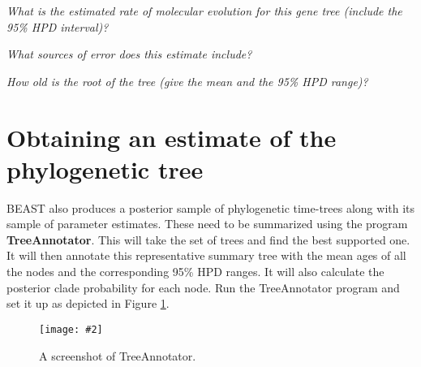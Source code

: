 \documentclass[11pt]{article}
\theoremstyle{plain}%
\theoremstyle{definition}
\theoremstyle{remark}
\newcommand{\includeimage}[2][]{%
\texttt{[image: \#2]}
}
\begin{document}
\textit{What is the estimated rate of molecular evolution for this gene tree (include the 95\% HPD interval)?}


\textit{What sources of error does this estimate include?}



\textit{How old is the root of the tree (give the mean and the 95\% HPD range)?}

  
%   
%
%
%
%
\newpage

\section{Obtaining an estimate of the phylogenetic tree}

BEAST also produces a posterior sample of phylogenetic time-trees along with its sample of parameter estimates. 
These need to be summarized using the program {\bf TreeAnnotator}. This will take the set of trees and find the best
supported one. It will then annotate this representative summary tree with the mean ages of all the
nodes and the corresponding 95\% HPD ranges. It will also calculate the posterior clade probability for each
node. Run the TreeAnnotator program and set it up as depicted in Figure \ref{fig:TreeAnnotator1}.

\begin{figure}
\centering	
\includeimage[width=0.9\textwidth]{figures/TreeAnnotator1}
\label{fig:TreeAnnotator1}
\caption{A screenshot of TreeAnnotator.}
\end{figure}
\end{document}

